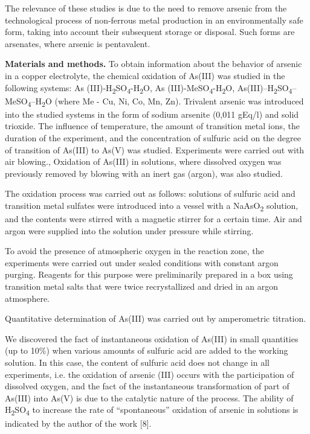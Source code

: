 \begin{multicols}{2}
The relevance of these studies is due to the need to remove arsenic from
the technological process of non-ferrous metal production in an
environmentally safe form, taking into account their subsequent storage
or disposal. Such forms are arsenates, where arsenic is pentavalent.

{\bfseries Materials and methods.} To obtain information about the behavior
of arsenic in a copper electrolyte, the chemical oxidation of As(III)
was studied in the following systems: As
(III)-H\textsubscript{2}SO\textsubscript{4}-H\textsubscript{2}O, As
(III)-MeSO\textsubscript{4}-H\textsubscript{2}O,
As(III)--H\textsubscript{2}SO\textsubscript{4}--MeSO\textsubscript{4}--H\textsubscript{2}O
(where Me - Cu, Ni, Co, Mn, Zn). Trivalent arsenic was introduced into
the studied systems in the form of sodium arsenite (0,011 gEq/l) and
solid trioxide. The influence of temperature, the amount of transition
metal ions, the duration of the experiment, and the concentration of
sulfuric acid on the degree of transition of As(III) to As(V) was
studied. Experiments were carried out with air blowing., Oxidation of
As(III) in solutions, where dissolved oxygen was previously removed by
blowing with an inert gas (argon), was also studied.

The oxidation process was carried out as follows: solutions of sulfuric
acid and transition metal sulfates were introduced into a vessel with a
NaAsO\textsubscript{2} solution, and the contents were stirred with a
magnetic stirrer for a certain time. Air and argon were supplied into
the solution under pressure while stirring.

To avoid the presence of atmospheric oxygen in the reaction zone, the
experiments were carried out under sealed conditions with constant argon
purging. Reagents for this purpose were preliminarily prepared in a box
using transition metal salts that were twice recrystallized and dried in
an argon atmosphere.

Quantitative determination of As(III) was carried out by amperometric
titration.

 We discovered the fact of instantaneous
oxidation of As(III) in small quantities (up to 10\%) when various
amounts of sulfuric acid are added to the working solution. In this
case, the content of sulfuric acid does not change in all experiments,
i.e. the oxidation of arsenic (III) occurs with the participation of
dissolved oxygen, and the fact of the instantaneous transformation of
part of As(III) into As(V) is due to the catalytic nature of the
process. The ability of H\textsubscript{2}SO\textsubscript{4} to
increase the rate of ``spontaneous'' oxidation of arsenic in solutions
is indicated by the author of the work {[}8{]}.


\end{multicols}
